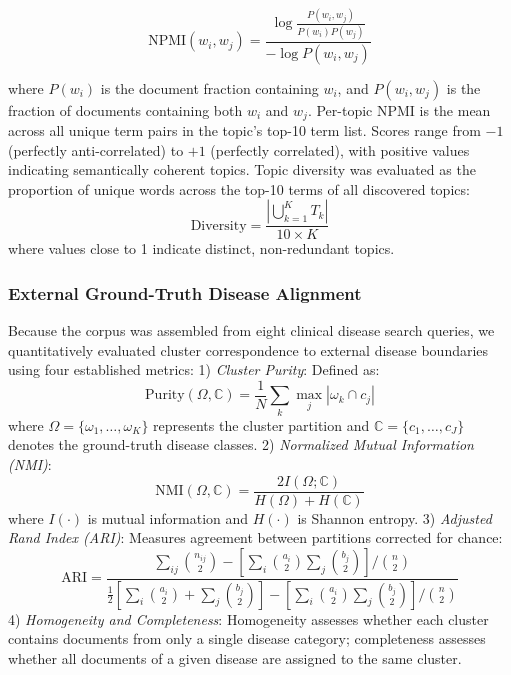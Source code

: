 \documentclass[a4paper,10pt,conference]{IEEEtran}
\begin{document}
\begin{equation}
\text{NPMI}(w_i, w_j) = \frac{\log \frac{P(w_i, w_j)}{P(w_i) P(w_j)}}{-\log P(w_i, w_j)}
\end{equation}

where $P(w_i)$ is the document fraction containing $w_i$, and $P(w_i, w_j)$ is the fraction of documents containing both $w_i$ and $w_j$. Per-topic NPMI is the mean across all unique term pairs in the topic's top-10 term list. Scores range from $-1$ (perfectly anti-correlated) to $+1$ (perfectly correlated), with positive values indicating semantically coherent topics. Topic diversity was evaluated as the proportion of unique words across the top-10 terms of all discovered topics:
\begin{equation}
\text{Diversity} = \frac{| \bigcup_{k=1}^K T_k |}{10 \times K}
\end{equation}
where values close to 1 indicate distinct, non-redundant topics.

\subsubsection{External Ground-Truth Disease Alignment}

Because the corpus was assembled from eight clinical disease search queries, we quantitatively evaluated cluster correspondence to external disease boundaries using four established metrics:
1) \textit{Cluster Purity}: Defined as:
\begin{equation}
\text{Purity}(\Omega, \mathbb{C}) = \frac{1}{N} \sum_{k} \max_j |\omega_k \cap c_j|
\end{equation}
where $\Omega = \{\omega_1, \dots, \omega_K\}$ represents the cluster partition and $\mathbb{C} = \{c_1, \dots, c_J\}$ denotes the ground-truth disease classes.
2) \textit{Normalized Mutual Information (NMI)}:
\begin{equation}
\text{NMI}(\Omega, \mathbb{C}) = \frac{2 I(\Omega; \mathbb{C})}{H(\Omega) + H(\mathbb{C})}
\end{equation}
where $I(\cdot)$ is mutual information and $H(\cdot)$ is Shannon entropy.
3) \textit{Adjusted Rand Index (ARI)}: Measures agreement between partitions corrected for chance:
\begin{equation}
\text{ARI} = \frac{\sum_{ij} \binom{n_{ij}}{2} - \left[ \sum_i \binom{a_i}{2} \sum_j \binom{b_j}{2} \right] / \binom{n}{2}}{\frac{1}{2} \left[ \sum_i \binom{a_i}{2} + \sum_j \binom{b_j}{2} \right] - \left[ \sum_i \binom{a_i}{2} \sum_j \binom{b_j}{2} \right] / \binom{n}{2}}
\end{equation}
4) \textit{Homogeneity and Completeness}: Homogeneity assesses whether each cluster contains documents from only a single disease category; completeness assesses whether all documents of a given disease are assigned to the same cluster.
\end{document}
